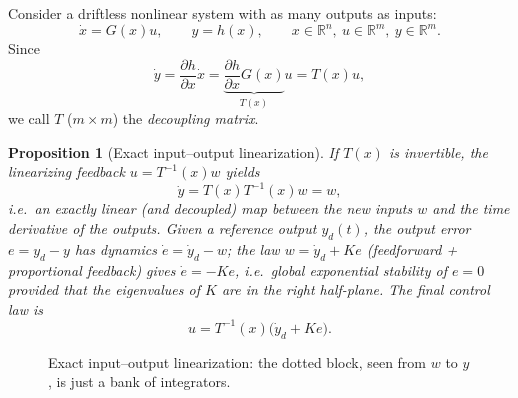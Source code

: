 \documentclass[11pt,a4paper]{article}
\def\bm#1{#1}%
\def\vect#1{#1}%
\newcommand{\R}{\mathbb{R}}
\newcommand{\vect}[1]{\bm{#1}}
\theoremstyle{definition}
\theoremstyle{plain}
\newtheorem{proposition}[definition]{Proposition}
\theoremstyle{remark}
\begin{document}
Consider a driftless nonlinear system with as many outputs as inputs:
\[
\dot{\vect x}=\vect G(\vect x)\vect u,\qquad \vect y=\vect h(\vect x),\qquad \vect x\in\R^n,\ \vect u\in\R^m,\ \vect y\in\R^m .
\]
Since
\[
\dot{\vect y}=\frac{\partial\vect h}{\partial\vect x}\dot{\vect x}=\underbrace{\frac{\partial\vect h}{\partial\vect x}\vect G(\vect x)}_{\vect T(\vect x)}\vect u=\vect T(\vect x)\vect u,
\]
we call $\vect T$ ($m\times m$) the \emph{decoupling matrix}.

\begin{proposition}[Exact input--output linearization]\label{prop:io}
If $\vect T(\vect x)$ is invertible, the \emph{linearizing feedback} $\vect u=\vect T^{-1}(\vect x)\vect w$ yields
\[
\dot{\vect y}=\vect T(\vect x)\vect T^{-1}(\vect x)\vect w=\vect w,
\]
i.e.\ an exactly linear (and decoupled) map between the new inputs $\vect w$ and the time derivative of the outputs. Given a reference output $\vect y_d(t)$, the output error $\vect e=\vect y_d-\vect y$ has dynamics $\dot{\vect e}=\dot{\vect y}_d-\vect w$; the law $\vect w=\dot{\vect y}_d+\vect K\vect e$ (feedforward + proportional feedback) gives $\dot{\vect e}=-\vect K\vect e$, i.e.\ \emph{global exponential stability} of $\vect e=\vect 0$ provided that the eigenvalues of $\vect K$ are in the right half-plane. The final control law is
\begin{equation}\label{eq:iolaw}
\vect u=\vect T^{-1}(\vect x)\bigl(\dot{\vect y}_d+\vect K\vect e\bigr).
\end{equation}
\end{proposition}

\begin{figure}[H]
\centering
{}
\caption{Exact input--output linearization: the dotted block, seen from $\vect w$ to $\vect y$, is just a bank of integrators.}
\end{figure}
\end{document}
